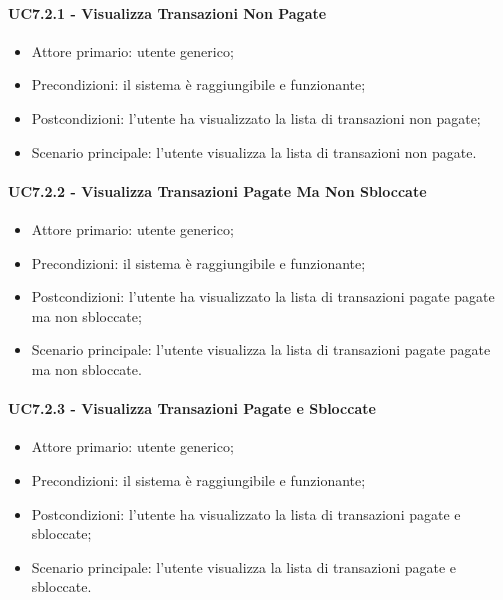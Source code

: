 \paragraph{UC7.2.1 - Visualizza Transazioni Non Pagate}

\begin{itemize}
    \item Attore primario: utente generico;
    \item Precondizioni: il sistema è raggiungibile e funzionante;
    \item Postcondizioni: l'utente ha visualizzato la lista di transazioni non pagate;
    \item Scenario principale: l'utente visualizza la lista di transazioni non pagate.
\end{itemize}

\paragraph{UC7.2.2 - Visualizza Transazioni Pagate Ma Non Sbloccate}

\begin{itemize}
    \item Attore primario: utente generico;
    \item Precondizioni: il sistema è raggiungibile e funzionante;
    \item Postcondizioni: l'utente ha visualizzato la lista di transazioni pagate pagate ma non sbloccate;
    \item Scenario principale: l'utente visualizza la lista di transazioni pagate pagate ma non sbloccate.
\end{itemize}

\paragraph{UC7.2.3 - Visualizza Transazioni Pagate e Sbloccate}

\begin{itemize}
    \item Attore primario: utente generico;
    \item Precondizioni: il sistema è raggiungibile e funzionante;
    \item Postcondizioni: l'utente ha visualizzato la lista di transazioni pagate e sbloccate;
    \item Scenario principale: l'utente visualizza la lista di transazioni pagate e sbloccate.
\end{itemize}


